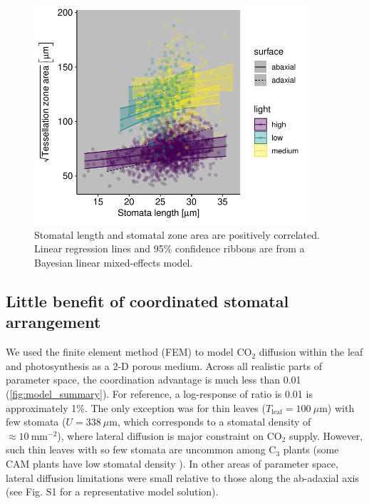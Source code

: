 \documentclass[webpdf,large,modern,unnumsec,namedate]{oup-authoring-template}
\begin{document}
\begin{figure}[ht]
\includegraphics[width = 4in]{figures/length-area.pdf}
\caption{Stomatal length and stomatal zone area are positively correlated. Linear regression lines and 95\% confidence ribbons are from a Bayesian linear mixed-effects model.}
\label{fig:length-area}
\end{figure}

\hypertarget{little-benefit-of-coordinated-stomatal-arrangement}{%
\subsection{Little benefit of coordinated stomatal
arrangement}\label{little-benefit-of-coordinated-stomatal-arrangement}}

We used the finite element method (FEM) to model CO\(_2\) diffusion
within the leaf and photosynthesis as a 2-D porous medium. Across all
realistic parts of parameter space, the coordination advantage is much
less than 0.01 (\autoref{fig:model_summary}). For reference, a
log-response of ratio is 0.01 is approximately 1\%. The only exception
was for thin leaves (\(T_\text{leaf} = 100~\mu \text{m}\)) with few
stomata (\(U = 338~\mu \text{m}\), which corresponds to a stomatal
density of \(\approx 10~\text{mm}^{-2}\)), where lateral diffusion is
major constraint on CO\(_2\) supply. However, such thin leaves with so
few stomata are uncommon among C\(_3\) plants (some CAM plants have low
stomatal density \citep{males_stomatal_2017}). In other areas of
parameter space, lateral diffusion limitations were small relative to
those along the ab-adaxial axis (see Fig. S1 for a representative model
solution).
\end{document}
